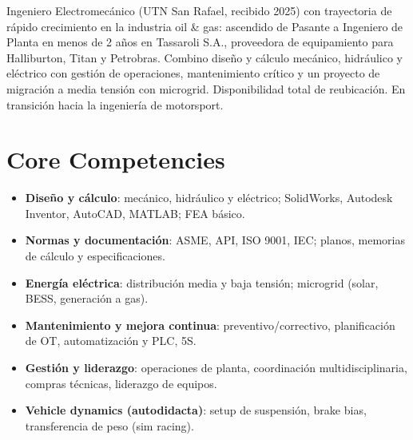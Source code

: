 \documentclass[11pt,a4paper,sans]{moderncv}
\begin{document}
\makecvtitle


\vspace{6pt}
\small{Ingeniero Electromecánico (UTN San Rafael, recibido 2025) con trayectoria de rápido crecimiento en la industria oil \& gas: ascendido de Pasante a Ingeniero de Planta en menos de 2 años en Tassaroli S.A., proveedora de equipamiento para Halliburton, Titan y Petrobras. Combino diseño y cálculo mecánico, hidráulico y eléctrico con gestión de operaciones, mantenimiento crítico y un proyecto de migración a media tensión con microgrid. Disponibilidad total de reubicación. En transición hacia la ingeniería de motorsport.}


\section{Core Competencies}
\vspace{1pt}
\begin{itemize}
\item \textbf{Diseño y cálculo}: mecánico, hidráulico y eléctrico; SolidWorks, Autodesk Inventor, AutoCAD, MATLAB; FEA básico.
\item \textbf{Normas y documentación}: ASME, API, ISO 9001, IEC; planos, memorias de cálculo y especificaciones.
\item \textbf{Energía eléctrica}: distribución media y baja tensión; microgrid (solar, BESS, generación a gas).
\item \textbf{Mantenimiento y mejora continua}: preventivo/correctivo, planificación de OT, automatización y PLC, 5S.
\item \textbf{Gestión y liderazgo}: operaciones de planta, coordinación multidisciplinaria, compras técnicas, liderazgo de equipos.
\item \textbf{Vehicle dynamics (autodidacta)}: setup de suspensión, brake bias, transferencia de peso (sim racing).
\end{itemize}

\end{document}
